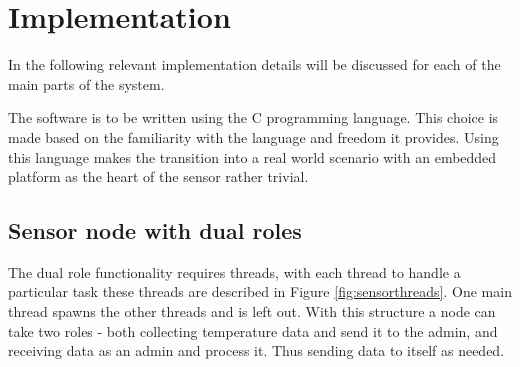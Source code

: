 \section{Implementation}
\label{sec:implementation}
In the following relevant implementation details will be discussed for each of the main parts of the system. 

The software is to be written using the C programming language. This choice is made based on the familiarity with the language and freedom it provides. Using this language makes the transition into a real world scenario with an embedded platform as the heart of the sensor rather trivial. 
\subsection{Sensor node with dual roles}
\label{subsec:sensornodedesign}
The dual role functionality requires threads, with each thread to handle a particular task these threads are described in Figure \ref{fig:sensorthreads}. One main thread spawns the other threads and is left out. With this structure a node can take two roles - both collecting temperature data and send it to the admin, and receiving data as an admin and process it. Thus sending data to itself as needed.

